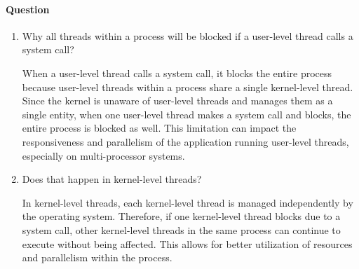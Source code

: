 \documentclass[a4paper,12pt,fleqn]{article}
\newcounter{question}
\newcommand*\question{%
\stepcounter{question}%
\paragraph{Question \thequestion}}
\begin{document}
\question 
{

}
\begin{enumerate}

\item
{
Why all threads within a process will be blocked if a user-level thread calls a system call? 
}
\begin{answer}
{
	 When a user-level thread calls a system call, it blocks the entire process because user-level threads within a process share a single kernel-level thread. Since the kernel is unaware of user-level threads and manages them as a single entity, when one user-level thread makes a system call and blocks, the entire process is blocked as well. This limitation can impact the responsiveness and parallelism of the application running user-level threads, especially on multi-processor systems.
}
\end{answer}

\item{} 
{
Does that happen in kernel-level threads?
}
\begin{answer}
{
	 In kernel-level threads, each kernel-level thread is managed independently by the operating system. Therefore, if one kernel-level thread blocks due to a system call, other kernel-level threads in the same process can continue to execute without being affected. This allows for better utilization of resources and parallelism within the process.
}
\end{answer}

\end{enumerate}

\end{document}
